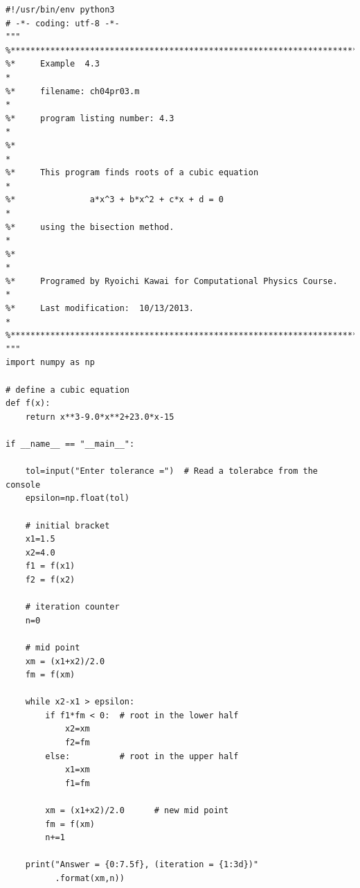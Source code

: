\bigskip\noindent
\program
\footnotesize
\begin{verbatim}
#!/usr/bin/env python3
# -*- coding: utf-8 -*-
"""
%**************************************************************************
%*     Example  4.3                                                       *
%*     filename: ch04pr03.m                                               *
%*     program listing number: 4.3                                        *
%*                                                                        *
%*     This program finds roots of a cubic equation                       *
%*               a*x^3 + b*x^2 + c*x + d = 0                              *
%*     using the bisection method.                                        *
%*                                                                        *
%*     Programed by Ryoichi Kawai for Computational Physics Course.       *
%*     Last modification:  10/13/2013.                                    *
%**************************************************************************
"""
import numpy as np

# define a cubic equation
def f(x):
    return x**3-9.0*x**2+23.0*x-15

if __name__ == "__main__": 
    
    tol=input("Enter tolerance =")  # Read a tolerabce from the console
    epsilon=np.float(tol)
    
    # initial bracket
    x1=1.5
    x2=4.0
    f1 = f(x1)
    f2 = f(x2)

    # iteration counter
    n=0

    # mid point
    xm = (x1+x2)/2.0
    fm = f(xm)
    
    while x2-x1 > epsilon:
        if f1*fm < 0:  # root in the lower half
            x2=xm
            f2=fm
        else:          # root in the upper half
            x1=xm
            f1=fm

        xm = (x1+x2)/2.0      # new mid point
        fm = f(xm)
        n+=1

    print("Answer = {0:7.5f}, (iteration = {1:3d})"
          .format(xm,n))
\end{verbatim}
\normalsize


